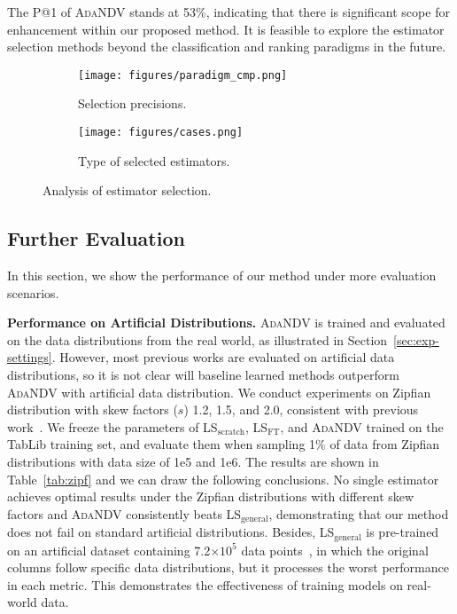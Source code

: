 The P@1 of \textsc{AdaNDV} stands at {53\%}, indicating that there is significant scope for enhancement within our proposed method. It is feasible to explore the estimator selection methods beyond the classification and ranking paradigms in the future. 




\begin{figure}[t]
    \centering
    \begin{subfigure}{0.21\textwidth}
         \centering
         \texttt{[image: figures/paradigm\_cmp.png]}
    \caption{Selection precisions.}
    \label{fig:cmp-paradigm}
     \end{subfigure}
     \begin{subfigure}{0.25\textwidth}
         \centering
         \texttt{[image: figures/cases.png]}
         \caption{{Type of selected estimators.}}\label{fig:cases}
     \end{subfigure}
     \caption{{Analysis of estimator selection.}}\label{fig:impact}
\end{figure}





\subsection{{Further Evaluation}}\label{sec:dataanalysis}
{
In this section, we show the performance of our method under more evaluation scenarios.}

\noindent\textbf{{Performance on Artificial Distributions.}} { \textsc{AdaNDV} is trained and evaluated on the data distributions from the real world, as illustrated in Section~\ref{sec:exp-settings}. However, most previous works are evaluated on artificial data distributions, so it is not clear will baseline learned methods outperform \textsc{AdaNDV} with artificial data distribution. We conduct experiments on Zipfian distribution with skew factors ($s$) 1.2, 1.5, and 2.0, consistent with previous work~\cite{li2022sampling}. We freeze the parameters of LS$_{\mathrm{scratch}}$, LS$_{\mathrm{FT}}$, and \textsc{AdaNDV} trained on the TabLib training set, and evaluate them when sampling 1\% of data from Zipfian distributions with data size of 1e5 and 1e6. The results are shown in Table~\ref{tab:zipf} and we can draw the following conclusions. No single estimator achieves optimal results under the Zipfian distributions with different skew factors and \textsc{AdaNDV} consistently beats LS$_{\mathrm{general}}$, demonstrating that our method does not fail on standard artificial distributions. Besides, LS$_{\mathrm{general}}$ is pre-trained on an artificial dataset containing 7.2$\times 10^5$ data points~\cite{ls_wu2022learning}, in which the original columns follow specific data distributions, but it processes
the worst performance in each metric. This demonstrates the effectiveness of training models on real-world data. 
}

